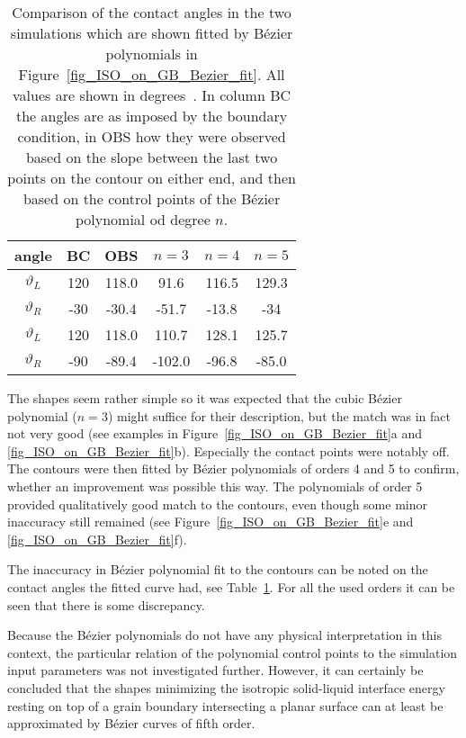 \begin{table}
	\centering
	\caption[PF wetting simulation of a particle with isotropic interface energy ona a GB - comparison of measured contact angles]{Comparison of the contact angles in the two simulations which are shown fitted by Bézier polynomials in Figure~\ref{fig_ISO_on_GB_Bezier_fit}. All values are shown in degrees~\textdegree. In column BC the angles are as imposed by the boundary condition, in OBS how they were observed based on the slope between the last two points on the contour on either end, and then based on the control points of the Bézier polynomial od degree $n$.}
	\label{tab_ISO_on_GB_angles_measured}
	\begin{tabular}{c|c|c|c|c|c}
		angle & BC  & OBS & $n=3$ & $n=4$ & $n=5$\\ \hline \hline
		$\vartheta_L$ & 120 & 118.0 & 91.6 & 116.5 & 129.3 \\
		$\vartheta_R$ & -30 & -30.4 & -51.7 & -13.8 & -34   \\ \hline \hline
		$\vartheta_L$ & 120 & 118.0 & 110.7 & 128.1 & 125.7 \\
		$\vartheta_R$ & -90 & -89.4  & -102.0 &-96.8 & -85.0 \\ \hline \hline
	\end{tabular}
\end{table}

The shapes seem rather simple so it was expected that the cubic Bézier polynomial ($n=3$) might suffice for their description, but the match was in fact not very good (see examples in Figure~\ref{fig_ISO_on_GB_Bezier_fit}a and \ref{fig_ISO_on_GB_Bezier_fit}b). Especially the contact points were notably off. The contours were then fitted by Bézier polynomials of orders 4 and 5 to confirm, whether an improvement was possible this way. The polynomials of order 5 provided qualitatively good match to the contours, even though some minor inaccuracy still remained (see Figure~\ref{fig_ISO_on_GB_Bezier_fit}e and \ref{fig_ISO_on_GB_Bezier_fit}f). 

The inaccuracy in Bézier polynomial fit to the contours can be noted on the contact angles the fitted curve had, see Table~\ref{tab_ISO_on_GB_angles_measured}. For all the used orders it can be seen that there is some discrepancy.

Because the Bézier polynomials do not have any physical interpretation in this context, the particular relation of the polynomial control points to the simulation input parameters was not investigated further. However, it can certainly be concluded that the shapes minimizing the isotropic solid-liquid interface energy resting on top of a grain boundary intersecting a planar surface can at least be approximated by Bézier curves of fifth order.

